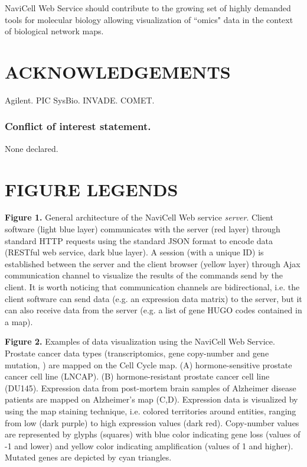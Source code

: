 \documentclass[a4,center,fleqn]{NAR}
\begin{document}
NaviCell Web Service should contribute to the growing set of highly demanded
tools for molecular biology allowing visualization of ``omics" data in the
context of biological network maps.

\section{ACKNOWLEDGEMENTS}

Agilent. PIC SysBio. INVADE. COMET.

\subsubsection{Conflict of interest statement.} None declared.
\newpage



\section{FIGURE LEGENDS}

\textbf{Figure 1.} General architecture of the NaviCell Web service
\emph{server}. Client software (light blue layer) communicates with the server
(red layer) through standard HTTP requests using the standard JSON format to
encode data (RESTful web service, dark blue layer). A session (with a unique ID)
is established between the server and the client browser (yellow layer) through
Ajax communication channel to visualize the results of the commands send by the
client. It is worth noticing that communication channels are bidirectional, i.e.
the client software can send data (e.g. an expression data matrix) to the
server, but it can also receive data from the server (e.g. a list of gene HUGO
codes contained in a map).

\textbf{Figure 2.} Examples of data visualization using the NaviCell Web
Service. Prostate cancer data types (transcriptomics, gene copy-number and gene
mutation, \cite{barretina2012cancer}) are mapped on the Cell Cycle map. (A) hormone-sensitive prostate
cancer cell line (LNCAP). (B) hormone-resistant prostate cancer cell line
(DU145). Expression data from post-mortem brain samples of Alzheimer disease
patients \cite{hokama2013altered} are mapped on Alzheimer's map (C,D). Expression data is visualized by
using the map staining technique, i.e. colored territories around entities,
ranging from low  (dark purple) to high expression values (dark red).
Copy-number values are represented by glyphs (squares) with blue color
indicating gene loss (values of -1 and lower) and yellow color indicating
amplification (values of 1 and higher). Mutated genes are depicted by cyan
triangles. 
\end{document}
